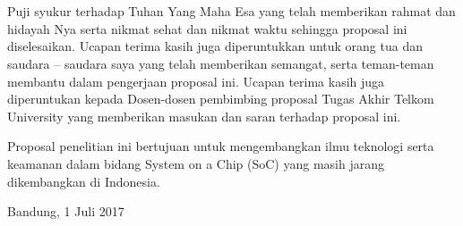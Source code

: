 \chapter*{\kataPengantar}

Puji syukur terhadap Tuhan Yang Maha Esa yang telah memberikan
rahmat dan hidayah Nya serta nikmat sehat dan nikmat waktu sehingga proposal
ini diselesaikan. Ucapan terima kasih juga diperuntukkan untuk orang tua dan
saudara – saudara saya yang telah memberikan semangat, serta teman-teman
membantu dalam pengerjaan proposal ini. Ucapan terima kasih juga diperuntukan
kepada Dosen-dosen pembimbing proposal Tugas Akhir Telkom
University yang memberikan masukan dan saran terhadap proposal ini.

\vspace*{0.25cm}
\noindent Proposal penelitian ini bertujuan untuk mengembangkan ilmu teknologi
serta keamanan dalam bidang System on a Chip (SoC) yang masih jarang
dikembangkan di Indonesia. 

\vspace*{0.1cm}
\begin{flushright}
Bandung, 1 Juli 2017\\[0.1cm]
\vspace*{1cm}
\penulis

\end{flushright}
